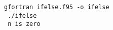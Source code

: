 \begin{Verbatim}[frame=lines,label=ifelse - commands and output]
 gfortran ifelse.f95 -o ifelse
 ./ifelse
 n is zero
\end{Verbatim}
